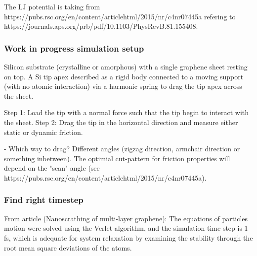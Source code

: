 The LJ potential is taking from https://pubs.rsc.org/en/content/articlehtml/2015/nr/c4nr07445a refering to https://journals.aps.org/prb/pdf/10.1103/PhysRevB.81.155408.


\subsubsection*{Work in progress simulation setup}
Silicon substrate (crystalline or amorphous) with a single graphene sheet resting on top. A Si tip apex described as a rigid body connected to a moving support (with no atomic interaction) via a harmonic spring to drag the tip apex across the sheet. \par
Step 1: Load the tip with a normal force such that the tip begin to interact with the sheet. Step 2: Drag the tip in the horizontal direction and measure either static or dynamic friction. 

- Which way to drag? Different angles (zigzag direction, armchair direction or something inbetween). The optimial cut-pattern for friction properties will depend on the "scan" angle (see https://pubs.rsc.org/en/content/articlehtml/2015/nr/c4nr07445a). 


\subsubsection*{Find right timestep}
From article (Nanoscrathing of multi-layer graphene): The equations of particles motion were solved using the Verlet algorithm, and the simulation time step is 1 fs, which is adequate for system relaxation by examining the stability through the root mean square deviations of the atoms.